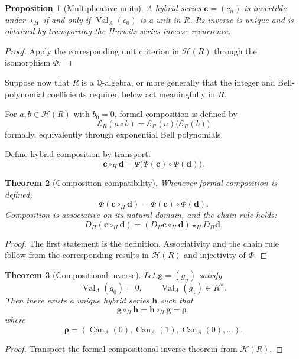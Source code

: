\documentclass[11pt]{article}
\newtheorem{theorem}{Theorem}[section]
\newtheorem{proposition}[theorem]{Proposition}
\newcommand{\Q}{\mathbb Q}
\newcommand{\HR}{\mathcal H}
\newcommand{\Val}{\operatorname{Val}_A}
\newcommand{\Can}{\operatorname{Can}_A}
\begin{document}
\begin{proposition}[Multiplicative units]
A hybrid series $\mathbf c=(c_n)$ is invertible under $\star_H$ if and only if $\Val(c_0)$ is a unit in $R$.  Its inverse is unique and is obtained by transporting the Hurwitz-series inverse recurrence.
\end{proposition}

\begin{proof}
Apply the corresponding unit criterion in $\HR(R)$ through the isomorphism $\Phi$.
\end{proof}

Suppose now that $R$ is a $\Q$-algebra, or more generally that the integer and Bell-polynomial coefficients required below act meaningfully in $R$.

For $a,b\in\HR(R)$ with $b_0=0$, formal composition is defined by
\[
\mathcal E_R(a\circ b)
=
\mathcal E_R(a)\bigl(\mathcal E_R(b)\bigr)
\]
formally, equivalently through exponential Bell polynomials.

Define hybrid composition by transport:
\[
\mathbf c\circ_H\mathbf d
=
\Psi\bigl(\Phi(\mathbf c)\circ\Phi(\mathbf d)\bigr).
\]

\begin{theorem}[Composition compatibility]
Whenever formal composition is defined,
\[
\Phi(\mathbf c\circ_H\mathbf d)
=
\Phi(\mathbf c)\circ\Phi(\mathbf d).
\]
Composition is associative on its natural domain, and the chain rule holds:
\[
D_H(\mathbf c\circ_H\mathbf d)
=
(D_H\mathbf c\circ_H\mathbf d)\star_H D_H\mathbf d.
\]
\end{theorem}

\begin{proof}
The first statement is the definition.  Associativity and the chain rule follow from the corresponding results in $\HR(R)$ and injectivity of $\Phi$.
\end{proof}

\begin{theorem}[Compositional inverse]
Let $\mathbf g=(g_n)$ satisfy
\[
\Val(g_0)=0,
\qquad
\Val(g_1)\in R^\times.
\]
Then there exists a unique hybrid series $\mathbf h$ such that
\[
\mathbf g\circ_H\mathbf h
=
\mathbf h\circ_H\mathbf g
=
\boldsymbol\rho,
\]
where
\[
\boldsymbol\rho=(\Can(0),\Can(1),\Can(0),\ldots).
\]
\end{theorem}

\begin{proof}
Transport the formal compositional inverse theorem from $\HR(R)$.
\end{proof}
\end{document}

